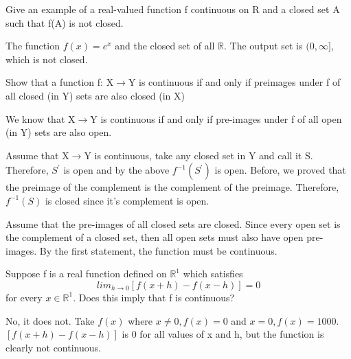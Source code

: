 \documentclass[12pt]{article}
\newenvironment{exercise}[2][Exercise]{\begin{trivlist}
\item[\hskip \labelsep {\bfseries #1}\hskip \labelsep {\bfseries #2.}]}{\end{trivlist}}
\begin{document}
\begin{exercise}{1.4}
 Give an example of a real-valued function f continuous on R and a closed set A such that f(A) is not closed.
\end{exercise}
The function $f(x) = e^x$ and the closed set of all $\mathbb{R}$. The output set is $(0, \infty]$, which is not closed.

\begin{exercise}{1.5}
 Show that a function f: X$\rightarrow$Y is continuous if and only if preimages under f of all closed (in Y) sets are also closed (in X)
\end{exercise}
We know that X$\rightarrow$Y is continuous if and only if pre-images under f of all open (in Y) sets are also open. 

Assume that X$\rightarrow$Y is continuous, take any closed set in Y and call it S. Therefore, $S^\prime$ is open and by the above $f^{-1}(S^\prime)$ is open. Before, we proved that the preimage of the complement is the complement of the preimage. Therefore, $f^{-1}(S)$ is closed since it's complement is open.

Assume that the pre-images of all closed sets are closed. Since every open set is the complement of a closed set, then all open sets must also have open pre-images. By the first statement, the function must be continuous. 

\begin{exercise}{Rudin 4.1}
Suppose f is a real function defined on $\mathbb{R}^1$ which satisfies 
$$lim_{h\to0}[f(x+h)-f(x-h)] = 0$$
for every $x \in \mathbb{R}^1$. Does this imply that f is continuous?
\end{exercise}
No, it does not. Take $f(x)$ where $x \neq 0, f(x) = 0$ and $x = 0, f(x) = 1000$. $[f(x+h)-f(x-h)]$ is 0 for all values of x and h, but the function is clearly not continuous.
 
\end{document}
